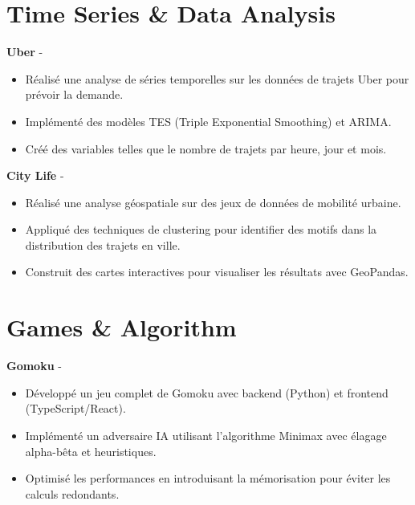 \documentclass[a4paper,11pt]{article}%
\begin{document}
\section*{Time Series \& Data Analysis}%
%
\noindent \textbf{Uber} - \href{https://github.com/sboof911/Uber}{{}}%
\begin{itemize}[leftmargin=2em,label={},parsep=0pt,topsep=1em]%
\item R\'ealis\'e une analyse de s\'eries temporelles sur les donn\'ees de trajets Uber pour pr\'evoir la demande.%
\item Impl\'ement\'e des mod\`eles TES (Triple Exponential Smoothing) et ARIMA.%
\item Cr\'e\'e des variables telles que le nombre de trajets par heure, jour et mois.%
\end{itemize}%
%
\noindent \textbf{City Life} - \href{https://github.com/sboof911/City-Life}{{}}%
\begin{itemize}[leftmargin=2em,label={},parsep=0pt,topsep=1em]%
\item R\'ealis\'e une analyse g\'eospatiale sur des jeux de donn\'ees de mobilit\'e urbaine.%
\item Appliqu\'e des techniques de clustering pour identifier des motifs dans la distribution des trajets en ville.%
\item Construit des cartes interactives pour visualiser les r\'esultats avec GeoPandas.%
\end{itemize}%
\section*{Games \& Algorithm}%
%
\noindent \textbf{Gomoku} - \href{https://github.com/sboof911/Gomoku}{{}}%
\begin{itemize}[leftmargin=2em,label={},parsep=0pt,topsep=1em]%
\item D\'evelopp\'e un jeu complet de Gomoku avec backend (Python) et frontend (TypeScript/React).%
\item Impl\'ement\'e un adversaire IA utilisant l'algorithme Minimax avec \'elagage alpha-b\^eta et heuristiques.%
\item Optimis\'e les performances en introduisant la m\'emorisation pour \'eviter les calculs redondants.%
\end{itemize}%
\end{document}
